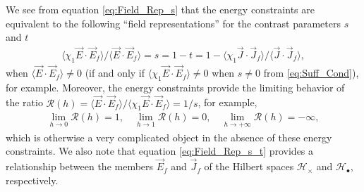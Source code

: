 \documentclass{cmslatex}
\begin{document}
 We see from equation \eqref{eq:Field_Rep_s} that the energy
 constraints are equivalent to the following ``field representations''
 for the contrast parameters $s$ and $t$
%
\begin{align}\label{eq:Field_Rep_s_t}
  \langle\chi_1\vec{E}\cdot\vec{E}_f\rangle/\langle\vec{E}\cdot\vec{E}_f\rangle
  =s=1-t
  =1- \langle\chi_1\vec{J}\cdot\vec{J}_f\rangle/\langle\vec{J}\cdot\vec{J}_f\rangle,
\end{align}
%
when $\langle\vec{E}\cdot\vec{E}_f\rangle\neq0$ (if and only if
$\langle\chi_1\vec{E}\cdot\vec{E}_f\rangle\neq0$ when $s\neq0$ from \eqref{eq:Suff_Cond}), for
example. Moreover, the energy constraints provide the limiting
behavior of the ratio
$\mathcal{R}(h)=\langle\vec{E}\cdot\vec{E}_f\rangle/\langle\chi_1\vec{E}\cdot\vec{E}_f\rangle=1/s$, for example,    
%
\begin{align}
  \lim_{h\to0}\mathcal{R}(h)=1, \quad
  \lim_{h\to1}\mathcal{R}(h)=0, \quad
  \lim_{h\to+\infty}\mathcal{R}(h)=-\infty,
\end{align}
%
which is otherwise a very complicated object in the absence of these
energy constraints.
We also note that equation \eqref{eq:Field_Rep_s_t} provides
a relationship between the members $\vec{E}_f$ and $\vec{J}_f$ of the
Hilbert spaces $\mathscr{H}_\times$ and $\mathscr{H}_{\bullet}$,
respectively. 
\end{document}
